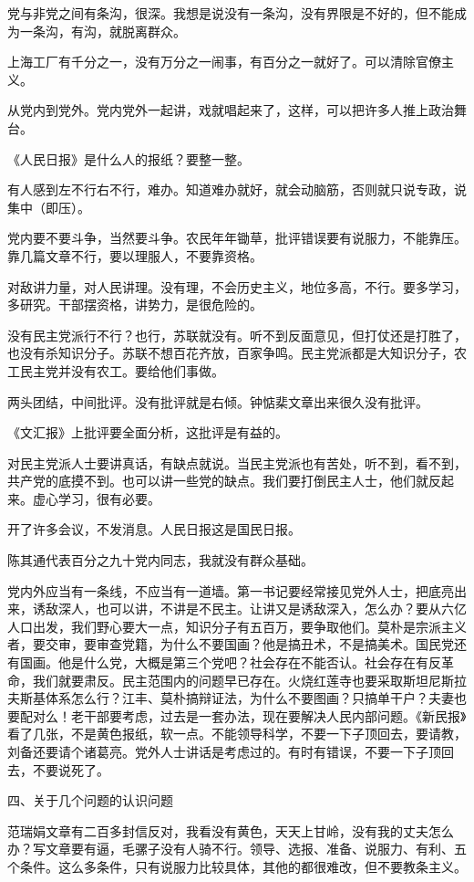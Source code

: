 党与非党之间有条沟，很深。我想是说没有一条沟，没有界限是不好的，但不能成为一条沟，有沟，就脱离群众。

上海工厂有千分之一，没有万分之一闹事，有百分之一就好了。可以清除官僚主义。

从党内到党外。党内党外一起讲，戏就唱起来了，这样，可以把许多人推上政治舞台。

《人民日报》是什么人的报纸？要整一整。

有人感到左不行右不行，难办。知道难办就好，就会动脑筋，否则就只说专政，说集中（即压）。

党内要不要斗争，当然要斗争。农民年年锄草，批评错误要有说服力，不能靠压。靠几篇文章不行，要以理服人，不要靠资格。

对敌讲力量，对人民讲理。没有理，不会历史主义，地位多高，不行。要多学习，多研究。干部摆资格，讲势力，是很危险的。

没有民主党派行不行？也行，苏联就没有。听不到反面意见，但打仗还是打胜了，也没有杀知识分子。苏联不想百花齐放，百家争鸣。民主党派都是大知识分子，农工民主党并没有农工。要给他们事做。

两头团结，中间批评。没有批评就是右倾。钟惦棐文章出来很久没有批评。

《文汇报》上批评要全面分析，这批评是有益的。

对民主党派人士要讲真话，有缺点就说。当民主党派也有苦处，听不到，看不到，共产党的底摸不到。也可以讲一些党的缺点。我们要打倒民主人士，他们就反起来。虚心学习，很有必要。

开了许多会议，不发消息。人民日报这是国民日报。

陈其通代表百分之九十党内同志，我就没有群众基础。

党内外应当有一条线，不应当有一道墙。第一书记要经常接见党外人士，把底亮出来，诱敌深人，也可以讲，不讲是不民主。让讲又是诱敌深入，怎么办？要从六亿人口出发，我们野心要大一点，知识分子有五百万，要争取他们。莫朴是宗派主义者，要交审，要审查党籍，为什么不要国画？他是搞丑术，不是搞美术。国民党还有国画。他是什么党，大概是第三个党吧？社会存在不能否认。社会存在有反革命，我们就要肃反。民主范围内的问题早已存在。火烧红莲寺也要采取斯坦尼斯拉夫斯基体系怎么行？江丰、莫朴搞辩证法，为什么不要图画？只搞单干户？夫妻也要配对么！老干部要考虑，过去是一套办法，现在要解决人民内部问题。《新民报》看了几张，不是黄色报纸，软一点。不能领导科学，不要一下子顶回去，要请教，刘备还要请个诸葛亮。党外人士讲话是考虑过的。有时有错误，不要一下子顶回去，不要说死了。

四、关于几个问题的认识问题

范瑞娟文章有二百多封信反对，我看没有黄色，天天上甘岭，没有我的丈夫怎么办？写文章要有逼，毛骡子没有人骑不行。领导、选报、准备、说服力、有利、五个条件。这么多条件，只有说服力比较具体，其他的都很难改，但不要教条主义。

